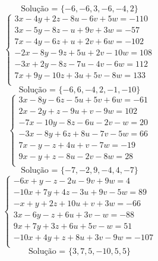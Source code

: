 \documentclass[12pt,oneside,a4paper]{article}
\begin{document}
\begin{equation*}
\text{Solução = }\{-6,-6,3,-6,-4,2\}
\end{equation*}
\vspace{\baselineskip}
\begin{equation*}
\begin{cases}
3x-4y+2z-8u-6v+5w=-110 \\
3x-5y-8z-u+9v+3w=-57 \\
7x-4y-6z+u+2v+6w=-102 \\
-2x-8y-9z+5u+2v-10w=108 \\
-3x+2y-8z-7u-4v-6w=112 \\
7x+9y-10z+3u+5v-8w=133 \\
\end{cases}
\end{equation*}
\begin{equation*}
\text{Solução = }\{-6,6,-4,2,-1,-10\}
\end{equation*}
\vspace{\baselineskip}
\begin{equation*}
\begin{cases}
3x-8y-6z-5u+5v+6w=-61 \\
2x-2y+z-9u+v-9w=102 \\
-7x-10y-8z-6u-2v-w=20 \\
-3x-8y+6z+8u-7v-5w=66 \\
7x-y-z+4u+v-7w=-19 \\
9x-y+z-8u-2v-8w=28 \\
\end{cases}
\end{equation*}
\begin{equation*}
\text{Solução = }\{-7,-2,9,-4,4,-7\}
\end{equation*}
\vspace{\baselineskip}
\begin{equation*}
\begin{cases}
-6x+y-z-2u-9v+9w=4 \\
-10x+7y+4z-3u+9v-5w=89 \\
-x+y+2z+10u+v+3w=-66 \\
3x-6y-z+6u+3v-w=-88 \\
9x+7y+3z+6u+5v-w=51 \\
-10x+4y+z+8u+3v-9w=-107 \\
\end{cases}
\end{equation*}
\begin{equation*}
\text{Solução = }\{3,7,5,-10,5,5\}
\end{equation*}
\end{document}
